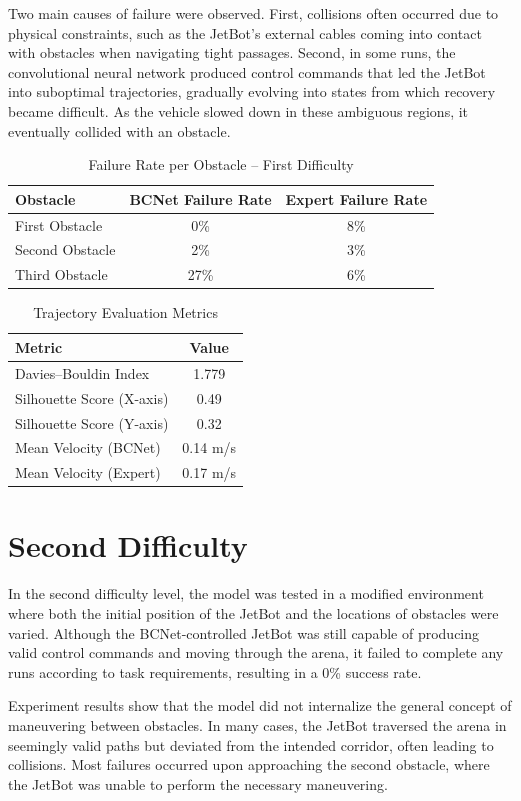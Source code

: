 Two main causes of failure were observed. First, collisions often occurred due to physical constraints, such as the JetBot's external cables coming into contact with obstacles when navigating tight passages. Second, in some runs, the convolutional neural network produced control commands that led the JetBot into suboptimal trajectories, gradually evolving into states from which recovery became difficult. As the vehicle slowed down in these ambiguous regions, it eventually collided with an obstacle.

\begin{table}[H]
  \centering
  \caption{Failure Rate per Obstacle – First Difficulty}
  \begin{tabular}{|l|c|c|}
    \hline
    \textbf{Obstacle}      & \textbf{BCNet Failure Rate} & \textbf{Expert Failure Rate} \\
    \hline
    First Obstacle         & 0\%                         & 8\%                           \\
    Second Obstacle        & 2\%                         & 3\%                           \\
    Third Obstacle         & 27\%                        & 6\%                           \\
    \hline
  \end{tabular}
\end{table}

\begin{table}[H]
  \centering
  \caption{Trajectory Evaluation Metrics}
  \label{tab:evaluation_metrics}
  \begin{tabular}{|l|c|}
    \hline
    \textbf{Metric} & \textbf{Value} \\
    \hline
    Davies–Bouldin Index & 1.779 \\
    Silhouette Score (X-axis) & 0.49 \\
    Silhouette Score (Y-axis) & 0.32 \\
    Mean Velocity (BCNet) & 0.14 m/s \\
    Mean Velocity (Expert) & 0.17 m/s \\
    \hline
  \end{tabular}
\end{table}

\section{Second Difficulty}

In the second difficulty level, the model was tested in a modified environment where both the initial position of the JetBot and the locations of obstacles were varied. Although the BCNet-controlled JetBot was still capable of producing valid control commands and moving through the arena, it failed to complete any runs according to task requirements, resulting in a 0\% success rate.

Experiment results show that the model did not internalize the general concept of maneuvering between obstacles. In many cases, the JetBot traversed the arena in seemingly valid paths but deviated from the intended corridor, often leading to collisions. Most failures occurred upon approaching the second obstacle, where the JetBot was unable to perform the necessary maneuvering.

